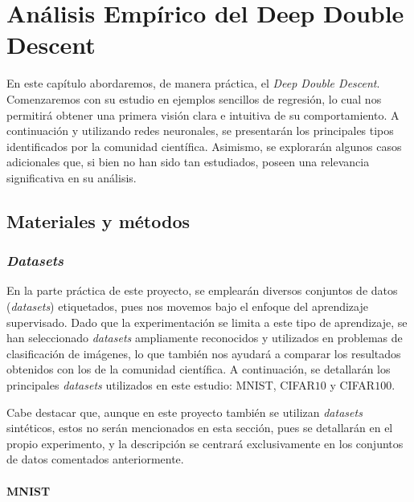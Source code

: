 
\chapter{Análisis Empírico del Deep Double Descent}\label{ch:analisis-empirico-ddd}

En este capítulo abordaremos, de manera práctica, el \textit{Deep Double Descent}. Comenzaremos con su estudio en ejemplos sencillos de regresión, lo cual nos permitirá obtener una primera visión clara e intuitiva de su comportamiento. A continuación y utilizando redes neuronales, se presentarán los principales tipos identificados por la comunidad científica. Asimismo, se explorarán algunos casos adicionales que, si bien no han sido tan estudiados, poseen una relevancia significativa en su análisis.

\section{Materiales y métodos}\label{sec:materiales-y-metodos}

\subsection{\textit{Datasets}}\label{subsec:datasets}

En la parte práctica de este proyecto, se emplearán diversos conjuntos de datos (\textit{datasets}) etiquetados, pues nos movemos bajo el enfoque del aprendizaje supervisado. Dado que la experimentación se limita a este tipo de aprendizaje, se han seleccionado \textit{datasets} ampliamente reconocidos y utilizados en problemas de clasificación de imágenes, lo que también nos ayudará a comparar los resultados obtenidos con los de la comunidad científica. A continuación, se detallarán los principales \textit{datasets} utilizados en este estudio: MNIST, CIFAR$10$ y CIFAR$100$.

Cabe destacar que, aunque en este proyecto también se utilizan \textit{datasets} sintéticos, estos no serán mencionados en esta sección, pues se detallarán en el propio experimento, y la descripción se centrará exclusivamente en los conjuntos de datos comentados anteriormente.

\subsubsection{MNIST}\label{subsubsec:MNIST}

